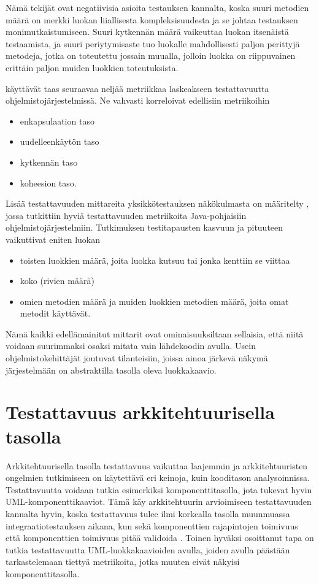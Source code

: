 \documentclass[finnish]{tktltiki2}
\theoremstyle{definition}
\theoremstyle{remark}
\begin{document}
\noindent
Nämä tekijät ovat negatiivisia asioita testauksen kannalta, koska suuri metodien määrä on merkki luokan liiallisesta kompleksisuudesta ja se johtaa testauksen monimutkaistumiseen. Suuri kytkennän määrä vaikeuttaa luokan itsenäistä testaamista, ja suuri periytymisaste tuo luokalle mahdollisesti paljon perittyjä metodeja, jotka on toteutettu jossain muualla, jolloin luokka on riippuvainen erittäin paljon muiden luokkien toteutuksista. 

\citep{Khan:2009:MBT:1507195.1507204} käyttävät taas seuraavaa neljää metriikkaa laskeakseen testattavuutta ohjelmistojärjestelmissä. Ne vahvasti korreloivat edellisiin metriikoihin 

\begin{itemize}
	\item enkapsulaation taso
	\item uudelleenkäytön taso
	\item kytkennän taso
	\item koheesion taso.
\end{itemize}   


Lisää testattavuuden mittareita yksikkötestauksen näkökulmasta on määritelty \citep{Bruntink:2004}, jossa tutkittiin hyviä testattavuuden metriikoita Java-pohjaisiin ohjelmistojärjestelmiin. Tutkimuksen testitapausten kasvuun ja pituuteen vaikuttivat eniten luokan 

\begin{itemize}
	\item toisten luokkien määrä, joita luokka kutsuu tai jonka kenttiin se viittaa
	\item koko (rivien määrä)
	\item omien metodien määrä ja muiden luokkien metodien määrä, joita omat metodit käyttävät.
\end{itemize} 

Nämä kaikki edellämainitut mittarit ovat ominaisuuksiltaan sellaisia, että niitä voidaan suurimmaksi osaksi mitata vain lähdekoodin avulla. Usein ohjelmistokehittäjät joutuvat tilanteisiin, joissa ainoa järkevä näkymä järjestelmään on abstraktilla tasolla oleva luokkakaavio.  

\section{Testattavuus arkkitehtuurisella tasolla}

Arkkitehtuurisella tasolla testattavuus vaikuttaa laajemmin ja arkkitehtuuristen ongelmien tutkimiseen on käytettävä eri keinoja, kuin kooditason analysoinnissa. Testattavuutta voidaan tutkia esimerkiksi komponenttitasolla, jota tukevat hyvin UML-komponenttikaaviot. Tämä käy arkkitehtuurin arvioimiseen testattavuuden kannalta hyvin, koska testattavuus tulee ilmi korkealla tasolla muunmuassa integraatiotestauksen aikana, kun sekä komponenttien rajapintojen toimivuus että komponenttien toimivuus pitää validoida \citep[s. 65]{Eickelmann:1996:MOS:243327.243602}. Toinen hyväksi osoittanut tapa on tutkia testattavuutta UML-luokkakaavioiden avulla, joiden avulla päästään tarkastelemaan tiettyä metriikoita, jotka muuten eivät näkyisi komponenttitasolla.  
\end{document}
